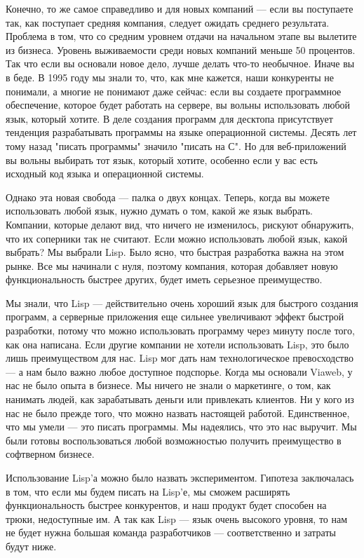 \documentclass[ebook,12pt,oneside,openany]{memoir}
\begin{document}
Конечно, то же самое справедливо и для новых компаний — если вы
поступаете так, как поступает средняя компания, следует ожидать
среднего результата. Проблема в том, что со средним уровнем отдачи на
начальном этапе вы вылетите из бизнеса. Уровень выживаемости среди
новых компаний меньше 50 процентов. Так что если вы основали новое
дело, лучше делать что-то необычное. Иначе вы в беде. В 1995 году мы
знали то, что, как мне кажется, наши конкуренты не понимали, а многие
не понимают даже сейчас: если вы создаете программное обеспечение,
которое будет работать на сервере, вы вольны использовать любой язык,
который хотите. В деле создания программ для десктопа присутствует
тенденция разрабатывать программы на языке операционной системы.
Десять лет тому назад "писать программы" значило "писать на С". Но для
веб-приложений вы вольны выбирать тот язык, который хотите, особенно
если у вас есть исходный код языка и операционной системы.

Однако эта новая свобода — палка о двух концах. Теперь, когда вы
можете использовать любой язык, нужно думать о том, какой же язык
выбрать. Компании, которые делают вид, что ничего не изменилось,
рискуют обнаружить, что их соперники так не считают. Если можно
использовать любой язык, какой выбрать? Мы выбрали Lisp. Было ясно,
что быстрая разработка важна на этом рынке. Все мы начинали с нуля,
поэтому компания, которая добавляет новую функциональность быстрее
других, будет иметь серьезное преимущество.

Мы знали, что Lisp — действительно очень хороший язык для быстрого
создания программ, а серверные приложения еще сильнее увеличивают
эффект быстрой разработки, потому что можно использовать программу
через минуту после того, как она написана. Если другие компании не
хотели использовать Lisp, это было лишь преимуществом для нас. Lisp
мог дать нам технологическое превосходство — а нам было важно любое
доступное подспорье. Когда мы основали Viaweb, у нас не было опыта в
бизнесе. Мы ничего не знали о маркетинге, о том, как нанимать людей,
как зарабатывать деньги или привлекать клиентов. Ни у кого из нас не
было прежде того, что можно назвать настоящей работой. Единственное,
что мы умели — это писать программы. Мы надеялись, что это нас
выручит. Мы были готовы воспользоваться любой возможностью получить
преимущество в софтверном бизнесе.

Использование Lisp'а можно было назвать экспериментом. Гипотеза
заключалась в том, что если мы будем писать на Lisp'е, мы сможем
расширять функциональность быстрее конкурентов, и наш продукт будет
способен на трюки, недоступные им. А так как Lisp — язык очень
высокого уровня, то нам не будет нужна большая команда разработчиков —
соответственно и затраты будут ниже.
\end{document}
